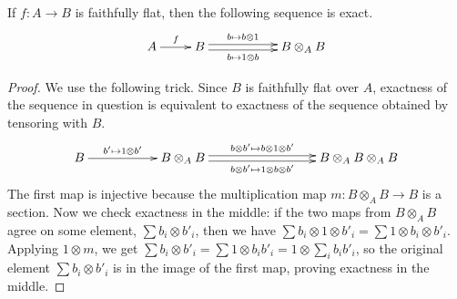 \begin{proposition}\label{lec06P:fflat_exact_sequence}
 If $f:A\to B$ is faithfully flat, then the following sequence is exact.
 \[\xymatrix{
  A\ar[r]^f & B \ar@<-.5ex>[rr]_<>(.5){b\mapsto 1\otimes b} \ar@<.5ex>[rr]^<>(.5){b\mapsto
 b\otimes 1} & & B\otimes_A B }\]
\end{proposition}
\begin{proof}
 We use the following trick. Since $B$ is faithfully flat over $A$, exactness of the sequence in question is equivalent to exactness of the sequence obtained by tensoring with $B$.
 \[\xymatrix{
 B\ar[rr]^<>(.5){b'\mapsto 1\otimes b'} & &
 B\otimes_A B \ar@<.5ex>[rrr]^<>(.5){b\otimes b'\mapsto b\otimes 1\otimes b'}
              \ar@<-.5ex>[rrr]_<>(.5){b\otimes b'\mapsto 1\otimes b\otimes b'} & & &
 B\otimes_A B\otimes_A B
 }\]
 The first map is injective because the multiplication map $m:B\otimes_A B\to B$ is a section. Now we check exactness in the middle: if the two maps from $B\otimes_A B$ agree on some element, $\sum b_i\otimes b'_i$, then we have $\sum b_i\otimes 1\otimes b'_i= \sum 1\otimes b_i\otimes b'_i$. Applying $1\otimes m$, we get $\sum b_i\otimes b'_i = \sum 1\otimes b_ib'_i = 1\otimes \sum_i b_ib'_i$, so the original element $\sum b_i\otimes b'_i$ is in the image of the first map, proving exactness in the middle.
%
%
\end{proof}
